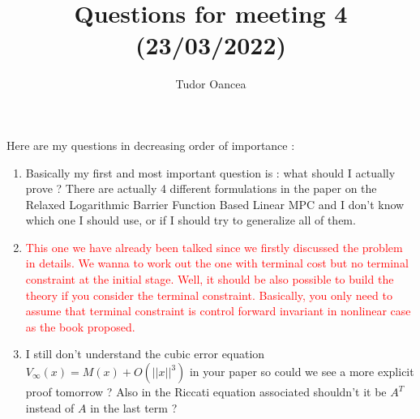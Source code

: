 \documentclass[12pt]{article}
\title{Questions for meeting 4 (23/03/2022)}
\author{Tudor Oancea}
\date{}
\numberwithin{theorem}{section} %
\theoremstyle{definition}
\theoremstyle{remark}
\begin{document}
\maketitle

\noindent Here are my questions in decreasing order of importance :
\begin{enumerate}
	\item
	Basically my first and most important question is : what should I actually prove ?
	There are actually 4 different formulations in the paper on the Relaxed Logarithmic Barrier Function Based Linear MPC and I don't know which one I should use, or if I should try to generalize all of them.
	\item[] \textcolor{red}{This one we have already been talked since we firstly discussed the problem in details. We wanna to work out the one with terminal cost but no terminal constraint at the initial stage. Well, it should be also possible to build the theory if you consider the terminal constraint. Basically, you only need to assume that terminal constraint is control forward invariant in nonlinear case as the book proposed.}
	\item I still don't understand the cubic error equation $V_\infty(x)=M(x)+O(||x||^3)$ in your paper so could we see a more explicit proof tomorrow ? Also in the Riccati equation associated shouldn't it be $A^T$ instead of $A$ in the last term ?


\end{enumerate}
\end{document}
